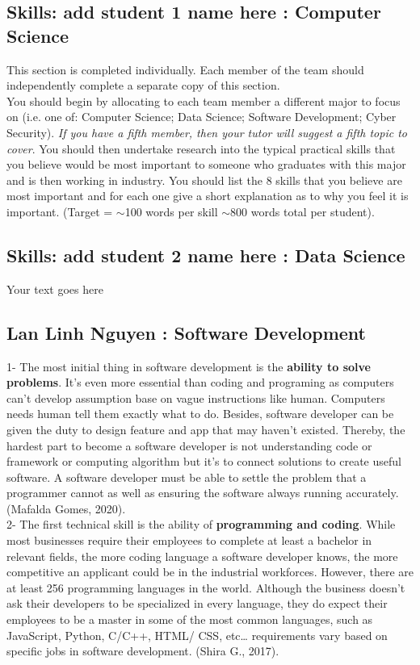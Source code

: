\documentclass[a4paper, 11pt]{report}
\begin{document}
	\subsection{Skills: add student 1 name here : Computer Science}
	This section is completed individually. Each member of the team should 
	independently complete a separate copy of this section.\\
	You should begin by allocating to each team member a different major to focus on 
	(i.e. one of: Computer Science; Data Science; Software Development; Cyber 
	Security). \textit{If you have a fifth member, then your tutor will suggest a fifth
		topic to cover}. You should then undertake research into the typical practical 
	skills that you believe would be most important to someone who graduates with this 
	major and is then working in industry. You should list the 8 skills that you 
	believe are most important and for each one give a short explanation as to why you 
	feel it is important. (Target = $\sim$100 words per skill $\sim$800 words total per
	student).
	\subsection{Skills: add student 2 name here : Data Science}
	Your text goes here
	\newpage
	\subsection{Lan Linh Nguyen : Software Development}
	1- The most initial thing in software development is the \textbf{ability to solve problems}. It’s even more essential than coding and programing as computers can’t develop assumption base on vague instructions like human. Computers needs human tell them exactly what to do. Besides, software developer can be given the duty to design feature and app that may haven’t existed. Thereby, the hardest part to become a software developer is not understanding code or framework or computing algorithm but it’s to connect solutions to create useful software. A software developer must be able to settle the problem that a programmer cannot as well as ensuring the software always running accurately. (Mafalda Gomes, 2020).\\
	
	2- The first technical skill is the ability of \textbf{programming and coding}. While most businesses require their employees to complete at least a bachelor in relevant fields, the more coding language a software developer knows, the more competitive an applicant could be in the industrial workforces. However, there are at least 256 programming languages in the world.  Although the business doesn’t ask their developers to be specialized in every language, they do expect their employees to be a master in some of the most common languages, such as JavaScript, Python, C/C++, HTML/ CSS, etc… requirements vary based on specific jobs in software development. (Shira G., 2017). \nocite{two}\\
	
\end{document}
